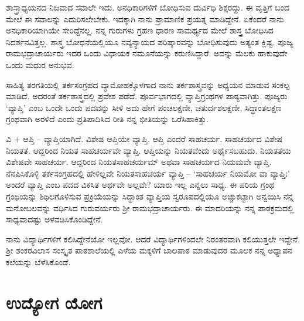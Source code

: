 ಶಾಸ್ತ್ರಾಧ್ಯಯನದ ನಿಜವಾದ ಸವಾಲೇ ಇದು.  ಅನಧಿಕಾರಿಗಳಿಗೆ ಬೋಧಿಸುವ ದುರ್ವಿಧಿ ಶಿಕ್ಷರದ್ದು.  ಈ ವೃತ್ತಿಗೆ ಬಂದ ಮೇಲೆ ಈ ಸವಾಲನ್ನು ಎದುರಿಸಲೇಬೇಕು.  ಇದಕ್ಕಾಗಿ ನಾನು ಪ್ರಾಮಾಣಿಕ ಪ್ರಯತ್ನ ಮಾಡಿದ್ದೇನೆ.  ಏಕೆಂದರೆ ನಾನು ಅನಧಿಕಾರಿಯಾಗಿಯೇ ಸೇರಿದ್ದೆನಲ್ಲ.  ನನ್ನ ಗುರುಗಳು ಗ್ರಹಣ ಧಾರಣ ಸಾಮರ್ಥ್ಯದ ಮೇಲೆ ಶಾಸ್ತ್ರ ಬೋಧಿಸಿದ ನಿದರ್ಶನವಿತ್ತಲ್ಲ.  ಶಾಸ್ತ್ರ ಬೋಧನೆಯಲ್ಲಿಯೂ ನವ್ಯನ್ಯಾಯದ ಪರಿಷ್ಕಾರವನ್ನು ಬೋಧಿಸುವುದು ಅತ್ಯಂತ ಕ್ಲಿಷ್ಟ.  ಪೂಜ್ಯ ರಾಮಭದ್ರಾಚಾರ್ಯರು ಇದರ ಒಂದು ವಿಧಾಯಕ ನಮೂನೆಯನ್ನು ಕರುಣಿಸಿದ್ದಾರೆ. ಅದನ್ನು ಮೆಲಕು ಹಾಕುವುದೇ ಒಂದು ಮಧುರ ಅನುಭವ.  

ಸಾಹಿತ್ಯ ತರಗತಿಯಲ್ಲಿ ತರ್ಕಸಂಗ್ರಹದ ವ್ಯಾಮೋಹಕ್ಕೊಳಗಾದ ನಾನು ತರ್ಕಶಾಸ್ತ್ರವನ್ನು ಅಧ್ಯಯನ ಮಾಡುವ ಸಂಕಲ್ಪ ಮಾಡಿದೆ.  ಅದರಂತೆ ತರ್ಕಶಾಸ್ತ್ರದಲ್ಲಿ ಪ್ರವೇಶ ಪಡೆದೆ.  ಪೂರ್ವಭಾಗದಲ್ಲಿ ವ್ಯಾಪ್ತಿಗ್ರಂಥಗಳ ಪಾಠ್ಯವಾಗಿತ್ತು.  ಪೂಜ್ಯರು ‘ವ್ಯಾಪ್ತಿ’ ಎಂಬ ಒಂದೇ ಒಂದು ಪದವನ್ನು ಸೀಳಿ ಅದು ಹೇಗೆ ಪಂಚಲಕ್ಷಣೀ, ಚತುರ್ದಶಲಕ್ಷಣೀ, ಸಿದ್ಧಾಂತಲಕ್ಷಣ ಗ್ರಂಥವಾಗಿ ಅರಳಿದೆ ಎಂದು ಪ್ರತಿಪಾದಿಸಿದ ರೀತಿ ನನ್ನ ಭೀತಿಯನ್ನು ಒರೆಸಿಹಾಕಿತ್ತು.  

ವಿ + ಆಪ್ತಿ – ವ್ಯಾಪ್ತಿಯಾಗಿದೆ.  ವಿಶೇಷ ಆಪ್ತಿಯೇ ವ್ಯಾಪ್ತಿ.  ಆಪ್ತಿ ಎಂದರೆ ಸಾಹಚರ್ಯ.  ಸಾಹಚರ್ಯದ ವಿಶೇಷ ನಿಯತತೆ.  ಆದ್ದರಿಂದ ನಿಯತ ಸಾಹಚರ್ಯವೇ ವ್ಯಾಪ್ತಿ. ಆಪ್ತಿಯನ್ನು ನಿಯತವೆಂದು ಅರ್ಥೈಸಬಹುದು.  ನಿಯತತೆಯ ವಿಶೇಷವೇ ಸಾಹಚರ್ಯ.  ಆದ್ದರಿಂದ ನಿಯತಸಾಹಚರ್ಯಮ್ ಅಥವಾ ಸಾಹಚರ್ಯದ ನಿಯಮವೇ ವ್ಯಾಪ್ತಿ.  ನೆನಪಿಸಿಕೊಳ್ಳಿ ತರ್ಕಸಂಗ್ರಹದಲ್ಲಿ ಹೇಳಿಲ್ಲವೇ ನಿಯತಸಾಹಚರ್ಯ ವ್ಯಾಪ್ತಿ – ‘ಸಾಹಚರ್ಯ ನಿಯಮೋ ವಾ ವ್ಯಾಪ್ತಿಃ’ ಅಂದರೆ ವ್ಯಾಪ್ತಿ ಎಂಬ ಪದದ ವಿಕಸಿತ ಅರ್ಥವೇ  ಅಲ್ಲವೇ? ಯಾರು ಇಲ್ಲ ಎನ್ನಲು ಸಾಧ್ಯ. ಈ ಪರಿಯ ಗ್ರಂಥ ಗ್ರಂಥಿಯನ್ನು ಶಿಥಿಲಗೊಳಿಸುವ ಪ್ರಕ್ರಿಯೆಯನ್ನು ಸಿದ್ಧಾಂತ ವ್ಯಾಪ್ತಿಯ ಸ್ವರೂಪದಲ್ಲಿಯೂ ಅಚ್ಚುಕಟ್ಟಾಗಿ ಅನ್ವಯಿಸಿ ನನ್ನ ಮನೋಬಲವನ್ನು ವರ್ಧಿಸಿದ ಗುರುವರ್ಯರು ಶ್ರೀ ರಾಮಭದ್ರಾಚಾರ್ಯರು.  ಈ ಮಾದರಿಯನ್ನು ನನ್ನ ಪಾಠಕ್ರಮದಲ್ಲಿ ಸಾಧ್ಯವಾದಷ್ಟು ಅಳವಡಿಸಿಕೊಂಡಿದ್ದೇನೆ.

ನಾನು ವಿದ್ಯಾರ್ಥಿಗಳಿಗೆ ಕಲಿಸಿದ್ದೇನೆಯೋ ಇಲ್ಲವೋ.  ಆದರೆ ವಿದ್ಯಾರ್ಥಿಗಳಿಂದಲೇ ನಿರಂತರವಾಗಿ ಕಲಿಯುತ್ತಲೇ ಇದ್ದೇನೆ.  ಶ್ರೀ ಶಂಕರವಿಲಾಸ ಸಂಸ್ಕೃತ ಪಾಠಶಾಲೆಯಲ್ಲಿ ಎಳೆಯ ಮಕ್ಕಳಿಗೆ ಬಾಲಪಾಠ ಮಾಡುವುದರ ಮೂಲಕ ನನ್ನ ಅಧ್ಯಾಪನ ಕಲೆಯನ್ನು ಬೆಳೆಸಿಕೊಂಡೆ.

\section*{ಉದ್ಯೋಗ ಯೋಗ}


